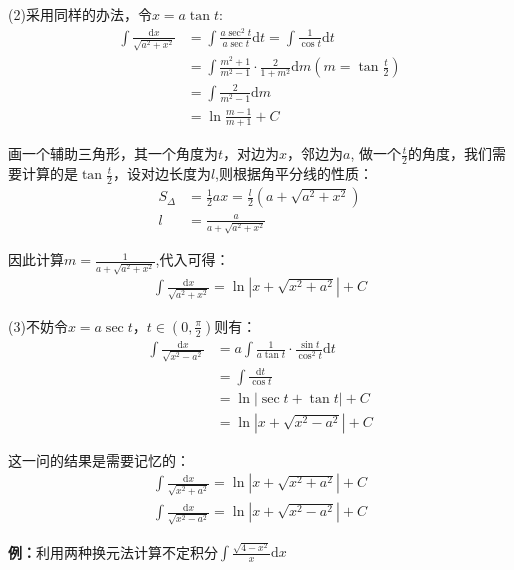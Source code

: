 \documentclass{ctexart}
\let\oldtextbf\textbf %
\renewcommand{\textbf}[1]{\textcolor{btex}{\oldtextbf{#1}}} %
\begin{document}
(2)采用同样的办法，令$x=a\tan t$:
\begin{align*}
    \int\frac{\mathrm{d}x}{\sqrt{a^2+x^2}}&=\int\frac{a\sec^2 t}{a\sec t}\mathrm{d}t=\int\frac{1}{\cos t}\mathrm{d}t\\
    &=\int \frac{m^2+1}{m^2-1}\cdot\frac{2}{1+m^2}\mathrm{d}m(m=\tan \frac{t}{2})\\
    &=\int\frac{2}{m^2-1}\mathrm{d}m\\
    &=\ln\frac{m-1}{m+1}+C
\end{align*}

画一个辅助三角形，其一个角度为$t$，对边为$x$，邻边为$a$, 做一个$\frac{t}{2}$的角度，我们需要计算的是$\tan\frac{t}{2}$，设对边长度为$l$,则根据角平分线的性质：
\begin{align*}
    S_\Delta&=\frac{1}{2}ax=\frac{l}{2}(a+\sqrt{a^2+x^2})\\
    l&=\frac{a}{a+\sqrt{a^2+x^2}}
\end{align*}

因此计算$m=\frac{1}{a+\sqrt{a^2+x^2}}$,代入可得：
\begin{align*}
    \int\frac{\mathrm{d}x}{\sqrt{a^2+x^2}}=\ln|x+\sqrt{x^2+a^2}|+C
\end{align*}

(3)不妨令$x=a\sec t，t\in (0,\frac{\pi}{2})$则有：
\begin{align*}
    \int \frac{\mathrm{d}x}{\sqrt{x^2-a^2}}&=a\int\frac{1}{a\tan t}\cdot\frac{\sin t}{\cos^2 t}\mathrm{d}t\\
    &=\int\frac{\mathrm{d}t}{\cos t}\\
    &=\ln|\sec t+\tan t|+C\\
    &=\ln|x+\sqrt{x^2-a^2}|+C
\end{align*}

\begin{tcolorbox}[
    colback=bac1,     %
    colframe=fra1,   %
    coltitle=white,             %
    coltext=tex1,
    title=基本积分公式拓展,
    fonttitle=\bfseries,        %
arc=3mm,                     %
breakable
]
这一问的结果是需要记忆的：
\begin{align*}
    \int\frac{\mathrm{d}x}{\sqrt{x^2+a^2}}=\ln|x+\sqrt{x^2+a^2}|+C\tag{4-6}\\
     \int\frac{\mathrm{d}x}{\sqrt{x^2-a^2}}=\ln|x+\sqrt{x^2-a^2}|+C\tag{4-7}
\end{align*}
\end{tcolorbox}

\textbf{例：}利用两种换元法计算不定积分$\int\frac{\sqrt{4-x^2}}{x}\mathrm{d}x$
\end{document}

